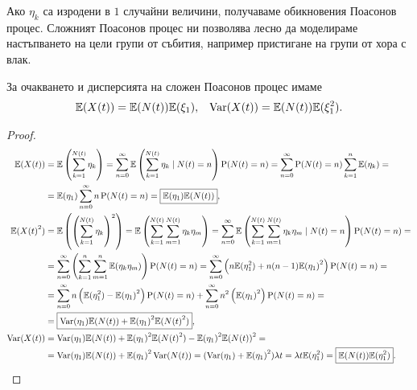 \documentclass[numbers=endperiod, DIV=15, bibliography=totocnumbered]{scrartcl}
\begin{document}
\begin{note}
  Ако $\eta_k$ са изродени в $1$ случайни величини, получаваме обикновения Поасонов процес. Сложният Поасонов процес ни позволява лесно да моделираме настъпването на цели групи от събития, например пристигане на групи от хора с влак.
\end{note}

\begin{theorem}
  За очакването и дисперсията на сложен Поасонов процес имаме
  \begin{align*}
    \mathbb{E}(X(t)) = \mathbb{E}(N(t)) \mathbb{E}(\xi_1),
    &&
    \operatorname{Var}(X(t)) = \mathbb{E}(N(t)) \mathbb{E}(\xi_1^2).
  \end{align*}
\end{theorem}
\begin{proof}
  \begin{align*}
    \mathbb{E}(X(t))
    &=
    \mathbb{E}\left( \sum_{k=1}^{N(t)} \eta_k \right)
    =
    \sum_{n=0}^\infty \mathbb{E}\left( \sum_{k=1}^{N(t)} \eta_k \mid N(t) = n \right) \operatorname{P}(N(t) = n)
    =
    \sum_{n=0}^\infty \operatorname{P}(N(t) = n) \sum_{k=1}^n \mathbb{E}(\eta_k)
    = \\ &=
    \mathbb{E}(\eta_1) \sum_{n=0}^\infty n \operatorname{P}(N(t) = n)
    =
    \boxed{\mathbb{E}(\eta_1) \mathbb{E}(N(t))},
    \\
    \mathbb{E}({X(t)}^2)
    &=
    \mathbb{E}\left( {\left(\sum_{k=1}^{N(t)} \eta_k \right)}^2 \right)
    =
    \mathbb{E}\left( \sum_{k=1}^{N(t)} \sum_{m=1}^{N(t)} \eta_k \eta_m \right)
    =
    \sum_{n=0}^\infty \mathbb{E}\left( \sum_{k=1}^{N(t)} \sum_{m=1}^{N(t)} \eta_k \eta_m \mid N(t) = n \right) \operatorname{P}(N(t) = n)
    = \\ &=
    \sum_{n=0}^\infty \left( \sum_{k=1}^n \sum_{m=1}^n \mathbb{E}(\eta_k \eta_m) \right) \operatorname{P}(N(t) = n)
    =
    \sum_{n=0}^\infty \left( n \mathbb{E}(\eta_1^2) + n (n-1) {\mathbb{E}(\eta_1)}^2 \right) \operatorname{P}(N(t) = n)
    = \\ &=
    \sum_{n=0}^\infty n \left( \mathbb{E}(\eta_1^2) - {\mathbb{E}(\eta_1)}^2 \right) \operatorname{P}(N(t) = n) + \sum_{n=0}^\infty n^2 \left( {\mathbb{E}(\eta_1)}^2 \right) \operatorname{P}(N(t) = n)
    = \\ &=
    \boxed{\operatorname{Var}(\eta_1) \mathbb{E}(N(t)) + {\mathbb{E}(\eta_1)}^2 \mathbb{E}({N(t)}^2)},
    \\
    \operatorname{Var}(X(t))
    &=
    \operatorname{Var}(\eta_1) \mathbb{E}(N(t)) + {\mathbb{E}(\eta_1)}^2 \mathbb{E}({N(t)}^2) - {\mathbb{E}(\eta_1)}^2 {\mathbb{E}(N(t))}^2
    = \\ &=
    \operatorname{Var}(\eta_1) \mathbb{E}(N(t)) + {\mathbb{E}(\eta_1)}^2 \operatorname{Var}(N(t))
    =
    (\operatorname{Var}(\eta_1) + {\mathbb{E}(\eta_1)}^2) \lambda t
    =
    \lambda t \mathbb{E}(\eta_1^2)
    =
    \boxed{\mathbb{E}(N(t)) \mathbb{E}(\eta_1^2)}.
  \end{align*}
\end{proof}
\end{document}
